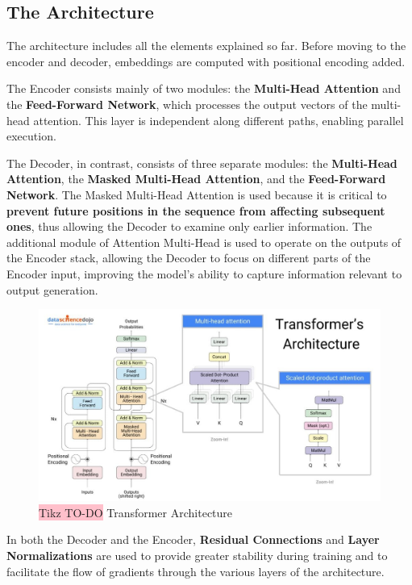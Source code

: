\subsection{The Architecture}

The architecture includes all the elements explained so far. Before moving to the encoder and decoder, embeddings are computed with positional encoding added.

The Encoder consists mainly of two modules: the \textbf{Multi-Head Attention} and the \textbf{Feed-Forward Network}, which processes the output vectors of the multi-head attention. This layer is independent along different paths, enabling parallel execution.

The Decoder, in contrast, consists of three separate modules: the \textbf{Multi-Head Attention}, the \textbf{Masked Multi-Head Attention}, and the \textbf{Feed-Forward Network}. The Masked Multi-Head Attention is used because it is critical to \textbf{prevent future positions in the sequence from affecting subsequent ones}, thus allowing the Decoder to examine only earlier information. The additional module of Attention Multi-Head is used to operate on the outputs of the Encoder stack, allowing the Decoder to focus on different parts of the Encoder input, improving the model's ability to capture information relevant to output generation.

\begin{figure}[!htbp]
    \centering
    \includegraphics[width=0.85\linewidth]{tikz/TRANSFORMERS.jpg}
    \caption{{\color{red}\colorbox{pink}{Tikz TO-DO}} Transformer Architecture}
\end{figure}

In both the Decoder and the Encoder, \textbf{Residual Connections} and \textbf{Layer Normalizations} are used to provide greater stability during training and to facilitate the flow of gradients through the various layers of the architecture.

